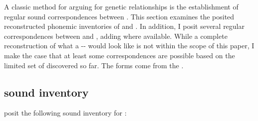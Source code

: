 \documentclass[output=paper]{LSP/langsci}
\begin{document}
A classic method for arguing for genetic relationships is the establishment of regular sound correspondences between . This section examines the posited reconstructed phonemic inventories of  and . In addition, I posit several regular correspondences between  and , adding   where available. While a complete reconstruction of what a -- would look like is not within the scope of this paper, I make the case that at least some correspondences are possible based on the limited set of  discovered so far. The  forms come from the  \citep{Rankinetal2015AccessSeptember}.

\subsection{ sound inventory}

\citet{RankinetalND} posit the following sound inventory for :
\end{document}
